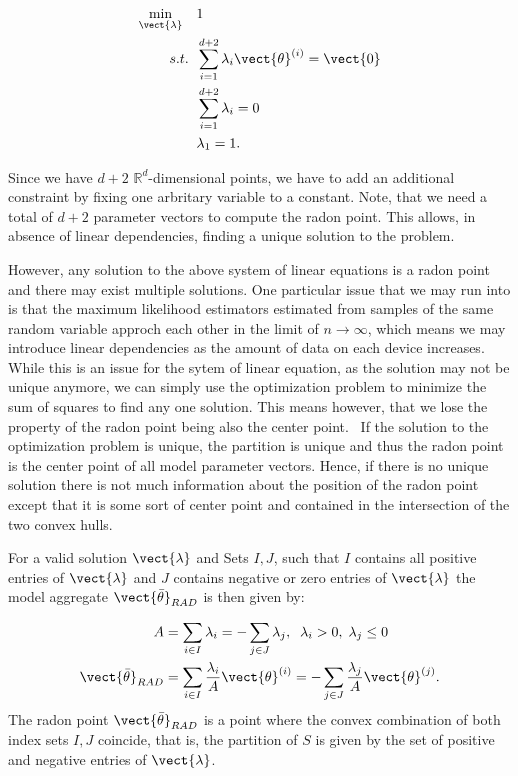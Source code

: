 \begin{equation}
    \label{eq:radonopt}
    \begin{split}
        \min_{\vect{\lambda}} \quad &1 \\
        s.t. \;\; &\sum_{i=1}^{d+2} \lambda_i \vect{\theta}^{(i)} = \vect{0}\\
             \;\; &\sum_{i=1}^{d+2} \lambda_i = 0 \\
             \; \; & \lambda_1 = 1.
    \end{split}
\end{equation}

Since we have $d+2$ $\mathbb{R}^d$-dimensional points, we have to add an additional constraint by fixing one arbritary variable to a constant. 
Note, that we need a total of $d+2$ parameter vectors to compute the radon point.
This allows, in absence of linear dependencies, finding a unique solution to the problem.

However, any solution to the above system of linear equations is a radon point and there may exist multiple solutions.
One particular issue that we may run into is that the maximum likelihood estimators estimated from samples of the same random variable approch each other in the limit of $n \rightarrow \infty$, which means we may introduce linear dependencies as the amount of data on each device increases.
While this is an issue for the sytem of linear equation, as the solution may not be unique anymore, we can simply use the optimization problem to minimize the sum of squares to find any one solution.
This means however, that we lose the property of the radon point being also the center point.~\cite{peterson1972geometry}
If the solution to the optimization problem is unique, the partition is unique and thus the radon point is the center point of all model parameter vectors.
Hence, if there is no unique solution there is not much information about the position of the radon point except that it is some sort of center point and contained in the intersection of the two convex hulls.

For a valid solution $\vect{\lambda}$ and Sets $I,J$, such that $I$ contains all positive entries of $\vect{\lambda}$ and $J$ contains negative or zero entries of $\vect{\lambda}$ the model aggregate $\vect{\bar{\theta}}_{RAD}$ is then given by:

\begin{equation}
    \label{eq:radonpoint}
    \begin{split}
    A &= \sum_{i\in I} \lambda_i = - \sum_{j\in J} \lambda_j, \; \;\lambda_i > 0, \; \lambda_j \leq 0 \\
    \vect{\bar{\theta}}_{RAD} &= \sum_{i\in I} \frac{\lambda_i}{A} \vect{\theta}^{(i)} = - \sum_{j\in J} \frac{\lambda_j}{A} \vect{\theta}^{(j)}.
    \end{split}
\end{equation}
The radon point $\vect{\bar{\theta}}_{RAD}$ is a point where the convex combination of both index sets $I, J$ coincide, that is, the partition of $S$ is given by the set of positive and negative entries of $\vect{\lambda}$.

